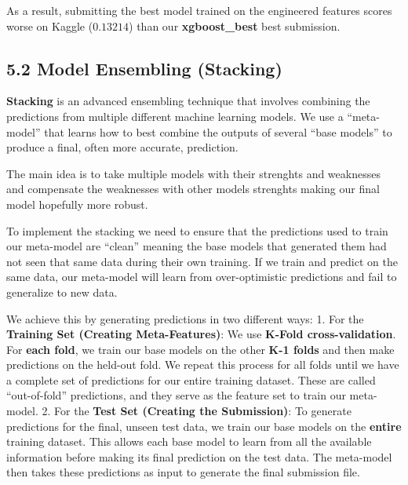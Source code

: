 \documentclass[11pt]{article}
\begin{document}
    As a result, submitting the best model trained on the engineered
features scores worse on Kaggle (\(0.13214\)) than our
\textbf{xgboost\_best} best submission.

    \subsection{5.2 Model Ensembling
(Stacking)}\label{model-ensembling-stacking}

    \textbf{Stacking} is an advanced ensembling technique that involves
combining the predictions from multiple different machine learning
models. We use a ``meta-model'' that learns how to best combine the
outputs of several ``base models'' to produce a final, often more
accurate, prediction.

The main idea is to take multiple models with their strenghts and
weaknesses and compensate the weaknesses with other models strenghts
making our final model hopefully more robust.

To implement the stacking we need to ensure that the predictions used to
train our meta-model are ``clean'' meaning the base models that
generated them had not seen that same data during their own training. If
we train and predict on the same data, our meta-model will learn from
over-optimistic predictions and fail to generalize to new data.

We achieve this by generating predictions in two different ways: 1. For
the \textbf{Training Set (Creating Meta-Features)}: We use
\textbf{K-Fold cross-validation}. For \textbf{each fold}, we train our
base models on the other \textbf{K-1 folds} and then make predictions on
the held-out fold. We repeat this process for all folds until we have a
complete set of predictions for our entire training dataset. These are
called ``out-of-fold'' predictions, and they serve as the feature set to
train our meta-model. 2. For the \textbf{Test Set (Creating the
Submission)}: To generate predictions for the final, unseen test data,
we train our base models on the \textbf{entire} training dataset. This
allows each base model to learn from all the available information
before making its final prediction on the test data. The meta-model then
takes these predictions as input to generate the final submission file.
\end{document}
